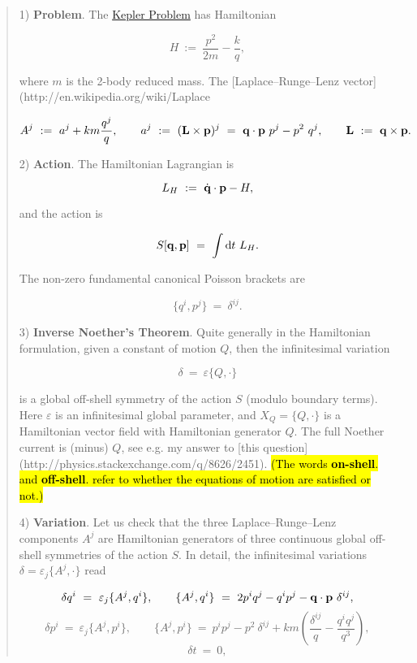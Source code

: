     \begin{quote}
        1) \textbf{Problem}. The \href{http://en.wikipedia.org/wiki/Kepler_problem}{Kepler Problem} has Hamiltonian

        $$ H~:=~ \frac{p^2}{2m}- \frac{k}{q},  $$

        where $m$ is the 2-body reduced mass. The [Laplace–Runge–Lenz vector](http://en.wikipedia.org/wiki/Laplace%

        $$ A^j ~:=~a^j  + km\frac{q^j}{q}, \qquad a^j~:=~({\bf L} \times {\bf p})^j~=~{\bf q}\cdot{\bf p}~p^j- p^2~q^j,\qquad {\bf L}~:=~ {\bf q} \times {\bf p}.$$ 

        2) \textbf{Action}. The Hamiltonian Lagrangian is

        $$  L_H~:=~ \dot{\bf q}\cdot{\bf p} - H, $$

        and the action is 

        $$ S[{\bf q},{\bf p}]~=~ \int {\rm d}t~L_H .$$

        The non-zero fundamental canonical Poisson brackets are 

        $$ \{ q^i , p^j\}~=~ \delta^{ij}. $$

        3) \textbf{Inverse Noether's Theorem}. Quite generally in the Hamiltonian formulation, given a constant of motion $Q$, then the infinitesimal variation 

        $$\delta~=~ \varepsilon \{Q,\cdot\}$$ 

        is a global off-shell symmetry of the action $S$ (modulo boundary terms). Here $\varepsilon$ is an infinitesimal global parameter, and $X_Q=\{Q,\cdot\}$ is a Hamiltonian vector field with Hamiltonian generator $Q$. The full Noether current is (minus) $Q$, see e.g. my answer to [this question](http://physics.stackexchange.com/q/8626/2451). \hl{(The words \textbf{on-shell}. and \textbf{off-shell}. refer to whether the equations of motion are satisfied or not.)}

        4) \textbf{Variation}. Let us check that the three Laplace–Runge–Lenz components $A^j$ are Hamiltonian generators of three continuous global off-shell symmetries of the action $S$. In detail, the infinitesimal variations $\delta= \varepsilon_j \{A^j,\cdot\}$ read

        $$ \delta  q^i ~=~  \varepsilon_j  \{A^j,q^i\}   , \qquad 
         \{A^j,q^i\} ~ =~ 2 p^i q^j - q^i p^j - {\bf q}\cdot{\bf p}~\delta^{ij}, $$
        $$ \delta  p^i ~=~  \varepsilon_j  \{A^j,p^i\}   , \qquad  
        \{A^j,p^i\}~ =~ p^i p^j - p^2~\delta^{ij} +km\left(\frac{\delta^{ij}}{q}- \frac{q^i q^j}{q^3}\right), $$
        $$ \delta  t ~=~0,$$


\end{quote}
